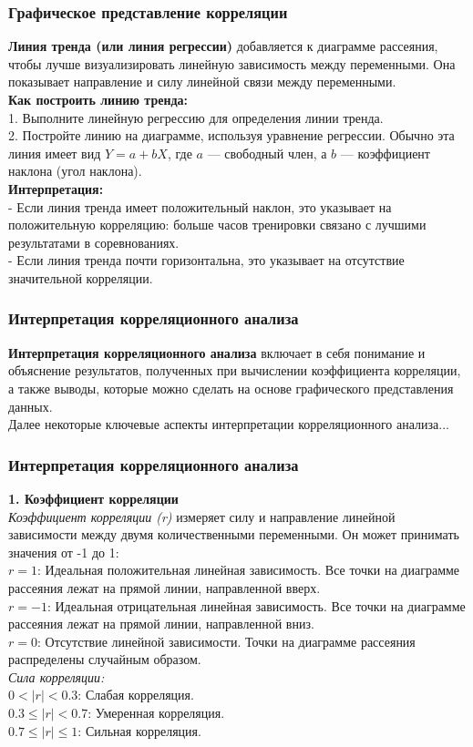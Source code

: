 \documentclass[aspectratio=169]{beamer}
\begin{document}
\begin{frame}
\frametitle{Графическое представление корреляции}
{\bf Линия тренда (или линия регрессии)} добавляется к диаграмме рассеяния, чтобы лучше визуализировать линейную зависимость между переменными. Она показывает направление и силу линейной связи между переменными.\\
{\bf Как построить линию тренда:}\\
1. Выполните линейную регрессию для определения линии тренда.\\
2. Постройте линию на диаграмме, используя уравнение регрессии. Обычно эта линия имеет вид \( Y = a + bX \), где \( a \) — свободный член, а \( b \) — коэффициент наклона (угол наклона).\\
{\bf Интерпретация:}\\
- Если линия тренда имеет положительный наклон, это указывает на положительную корреляцию: больше часов тренировки связано с лучшими результатами в соревнованиях.\\
- Если линия тренда почти горизонтальна, это указывает на отсутствие значительной корреляции.
\end{frame}

\begin{frame}
\frametitle{Интерпретация корреляционного анализа}
{\bf Интерпретация корреляционного анализа} включает в себя понимание и объяснение результатов, полученных при вычислении коэффициента корреляции, а также выводы, которые можно сделать на основе графического представления данных.\\
Далее некоторые ключевые аспекты интерпретации корреляционного анализа...
\end{frame}

\begin{frame}
\frametitle{Интерпретация корреляционного анализа}
{\bf 1. Коэффициент корреляции}\\
{\it Коэффициент корреляции (r)} измеряет силу и направление линейной зависимости между двумя количественными переменными. Он может принимать значения от -1 до 1:\\
\quad \( r = 1 \): Идеальная положительная линейная зависимость. Все точки на диаграмме рассеяния лежат на прямой линии, направленной вверх.\\
\quad \( r = -1 \): Идеальная отрицательная линейная зависимость. Все точки на диаграмме рассеяния лежат на прямой линии, направленной вниз.\\
\quad \( r = 0 \): Отсутствие линейной зависимости. Точки на диаграмме рассеяния распределены случайным образом.\\
{\it Сила корреляции:}\\
\quad $0 < |r| < 0.3$: Слабая корреляция.\\
\quad $0.3 \leq |r| < 0.7$: Умеренная корреляция.\\
\quad $0.7 \leq |r| \leq 1$: Сильная корреляция.
\end{frame}
\end{document}
